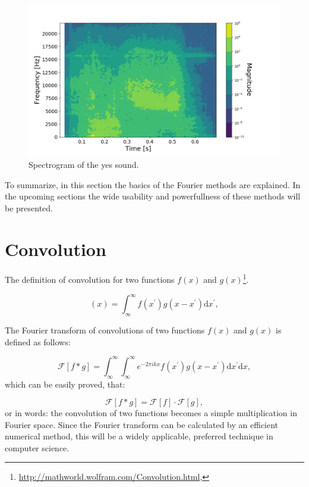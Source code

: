 \documentclass[12pt]{article}
\theoremstyle{plain}
\begin{document}
\begin{figure}[h!]
    \centering
	\includegraphics[width=.7\linewidth]{media/yes_sound_spectrogram.png}
	\caption{Spectrogram of the yes sound.}
	\label{spectrogram_2}
\end{figure}

To summarize, in this section the basics of the Fourier methods are explained. In the upcoming sections the wide usability and powerfullness of these methods will be presented.

\pagebreak
\section{Convolution}

The definition of convolution for two functions $f(x)$ and $g(x)$\footnote{\url{http://mathworld.wolfram.com/Convolution.html},}.

\begin{equation}
[f * g](x) = \int_{\infty}^{\infty} f(x^{\prime}) g( x - x^{\prime} ) \text{d}x^{\prime},
\end{equation}

The Fourier transform of convolutions of two functions $f(x)$ and $g(x)$ is defined as follows:

\begin{equation}
\mathcal{F}[f * g] = \int_{\infty}^{\infty} \int_{\infty}^{\infty} e^{-2\pi i k x} f(x^{\prime}) g( x - x^{\prime} ) \text{d}x^{\prime} \text{d}x,
\end{equation}
which can be easily proved, that:

\begin{equation}
\mathcal{F}[f * g] = \mathcal{F}[f] \cdot \mathcal{F}[g],
\end{equation}
or in words: the convolution of two functions becomes a simple multiplication in Fourier space. Since the Fourier transform can be calculated by an efficient numerical method, this will be a widely applicable, preferred technique in computer science.
\end{document}
